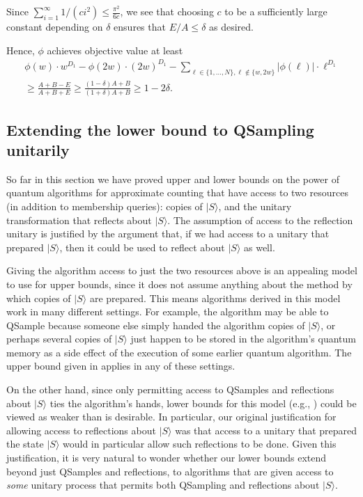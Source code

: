 \documentclass[10pt,a4paper]{article}
\newcommand{\<}{\langle}
\renewcommand{\>}{\rangle}
\begin{document}
Since $\sum_{i=1}^{\infty}1/(ci^2) \leq \frac{\pi^2}{6c}$, we see that
choosing $c$ to be a sufficiently large constant depending on $\delta$
ensures that $E/A \leq \delta$ as desired.

Hence, $\phi$ achieves objective value at least
\begin{align*}
\phi(w) \cdot w^{D_1} - \phi(2w) \cdot (2w)^{D_1} - \sum_{\ell \in \{1,
\dots, N\}, \ell \not\in \{w, 2w\}} |\phi(\ell)| \cdot \ell^{D_1} \\
\geq \frac{A + B - E}{A+B+E} \geq \frac{(1-\delta) A + B}{
(1+\delta)A + B} \geq 1-2\delta.
\end{align*}

%
\setcounter{subsection}{5}
\setcounter{theorem}{30}
\subsection{Extending the lower bound to QSampling unitarily}
\label{sec:unitary}
So far in this section we have proved upper and lower bounds on the power of quantum algorithms for approximate counting that have 
access to two resources (in addition to membership queries): 
copies of $|S\>$, and the unitary transformation that reflects about $|S\>$. 
The assumption of access to the reflection unitary is justified by the argument that, if we had access to a unitary that prepared $|S\>$, then it could be used to reflect about $|S\>$ as well. 

Giving the algorithm access 
to just the two resources above is an appealing model to use for upper bounds, since it does not assume anything about the method by which copies of $|S\>$ are prepared. This means algorithms
derived in this model work in many different settings.
For example, the algorithm may be able to QSample
because someone else simply handed the algorithm copies of $|S\>$, or perhaps several copies of $|S\>$ just happen to be stored in the algorithm's quantum memory as a side effect of the execution of some earlier quantum algorithm. The upper bound given
in  applies in any of these settings.


On the other hand, since only
permitting access to QSamples
and reflections about $|S\>$ ties the algorithm's hands,
lower bounds for this model
(e.g., ) could be viewed
as weaker than is desirable. 
In particular, our original 
justification
for allowing access to reflections about $|S\>$
was that access to a unitary that prepared 
the state $|S\>$ would in particular allow 
such reflections to be done. 
Given this justification, it is very natural to wonder whether 
our lower bounds extend beyond just 
QSamples and reflections, to
algorithms that are given access
to \emph{some} unitary process that 
permits both QSampling and reflections about $|S\>$. 
\end{document}
